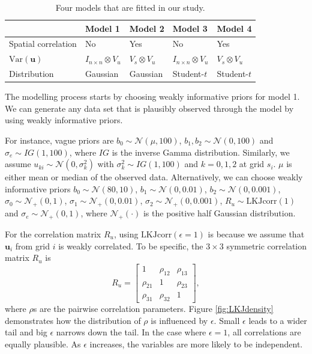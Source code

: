 \documentclass[a4paper]{article}   	%
\newcommand{\Var}{\mathrm{Var}}
\newcommand{\N}{\mathcal{N}}
\begin{document}
	
	\begin{table}[!htp]
		\centering
		\begin{tabular}{*{5}{l}} \toprule
			& Model 1 & Model 2& Model 3& Model 4  \\ \midrule
			Spatial correlation & No & Yes & No & Yes \\ 
			$\Var(\bm{u})$ &  $I_{n\times n}\otimes V_u$ & $V_s\otimes V_u$ & $I_{n\times n}\otimes V_u$ & $V_s\otimes V_u$ \\ 
			Distribution & Gaussian & Gaussian & Student-$t$ & Student-$t$ \\
			\bottomrule
		\end{tabular}\caption{Four models that are fitted in our study.}\label{tb:models}
	\end{table}
	
	
	The modelling process starts by choosing weakly informative priors for model 1. We can generate any data set that is plausibly observed through the model by using weakly informative priors. 
	
	For instance, vague priors are $b_0\sim \N(\mu,100)$, $b_1,b_2\sim \N(0,100)$ and $\sigma_e\sim IG(1,100)$, where $IG$ is the inverse Gamma distribution. Similarly, we assume $u_{ki}\sim \N(0,\sigma_{k}^2)$ with $\sigma_k^2\sim IG(1,100)$ and $k=0, 1, 2$ at grid $s_i$. $\mu$ is either mean or median of the observed data. Alternatively, we can choose weakly informative priors $b_0\sim \N(80,10)$, $b_1\sim \N(0,0.01)$, $b_2\sim \N(0,0.001)$, $\sigma_{0}\sim \N_+(0,1)$, $\sigma_{1}\sim \N_+(0,0.01)$, $\sigma_{2}\sim \N_+(0,0.001)$, $R_u\sim \mbox{LKJcorr}(1)$ and $\sigma_e\sim \N_+(0,1)$, where $\N_+(\cdot)$ is the positive half Gaussian distribution. 
	
	For the correlation matrix $R_u$, using $\mbox{LKJcorr}(\epsilon=1)$ is because we assume that $\bm{u}_i$ from grid $i$ is weakly correlated. To be specific, the $3\times3$ symmetric correlation matrix $R_u$ is  
	\begin{equation}\label{eq:RMat}
		R_u = \begin{bmatrix}
			1 & \rho_{12} &\rho_{13}  \\ \rho_{21} & 1 & \rho_{23} \\ \rho_{31} & \rho_{32} & 1 
		\end{bmatrix},
	\end{equation}
	where $\rho$s are the pairwise correlation parameters. Figure \ref{fig:LKJdensity} demonstrates how the distribution of $\rho$ is influenced by $\epsilon$. Small $\epsilon$ leads to a wider tail and big $\epsilon$ narrows down the tail. In the case where $\epsilon = 1$, all correlations are equally plausible. As $\epsilon$ increases, the variables are more likely to be independent. 
	
\end{document}
